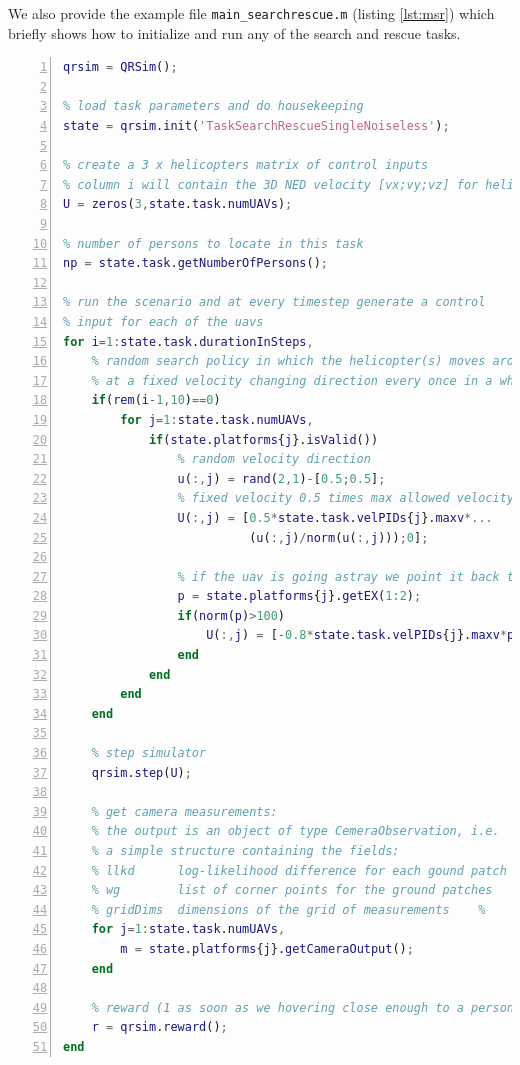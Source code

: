 \documentclass[a4paper,11pt]{report}
\begin{document}
We also provide the example file \texttt{main\_searchrescue.m} (listing \ref{lst:msr}) which briefly shows how to initialize and run any of the search and rescue tasks.
\begin{lstlisting}[float=ht!bp,caption=main\_searchrescue.m,language=Matlab,frame=lines,label=lst:msr,numbers=left,basicstyle=\small]
% create simulator object
qrsim = QRSim();

% load task parameters and do housekeeping
state = qrsim.init('TaskSearchRescueSingleNoiseless');

% create a 3 x helicopters matrix of control inputs
% column i will contain the 3D NED velocity [vx;vy;vz] for helicopter i
U = zeros(3,state.task.numUAVs);

% number of persons to locate in this task        
np = state.task.getNumberOfPersons();

% run the scenario and at every timestep generate a control
% input for each of the uavs
for i=1:state.task.durationInSteps,    
    % random search policy in which the helicopter(s) moves around
    % at a fixed velocity changing direction every once in a while    
    if(rem(i-1,10)==0)
        for j=1:state.task.numUAVs,     
            if(state.platforms{j}.isValid()) 
                % random velocity direction
                u(:,j) = rand(2,1)-[0.5;0.5];
                % fixed velocity 0.5 times max allowed velocity
                U(:,j) = [0.5*state.task.velPIDs{j}.maxv*...
                          (u(:,j)/norm(u(:,j)));0];
                
                % if the uav is going astray we point it back to the center
                p = state.platforms{j}.getEX(1:2);
                if(norm(p)>100)
                    U(:,j) = [-0.8*state.task.velPIDs{j}.maxv*p/norm(p);0];
                end
            end
        end
    end
    
    % step simulator
    qrsim.step(U);
    
    % get camera measurements:
    % the output is an object of type CemeraObservation, i.e.
    % a simple structure containing the fields:
    % llkd      log-likelihood difference for each gound patch
    % wg        list of corner points for the ground patches
    % gridDims  dimensions of the grid of measurements    %
    for j=1:state.task.numUAVs,
        m = state.platforms{j}.getCameraOutput();
    end   
    
    % reward (1 as soon as we hovering close enough to a person)
    r = qrsim.reward();
end
\end{lstlisting}
\end{document}
